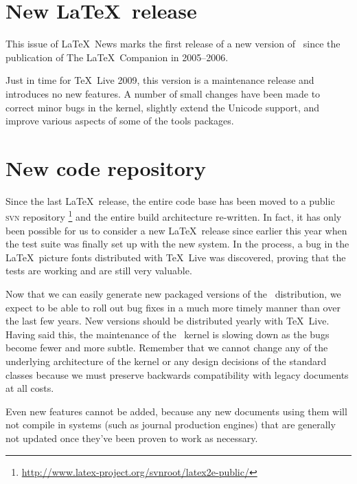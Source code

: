 \documentclass{ltnews}
\begin{document}
\maketitle

\section{New \LaTeX\ release}

This  issue of \LaTeX~News marks the first release of a new version of
\LaTeXe\ since the publication of The \LaTeX\ Companion in 2005--2006.

Just in time for \TeX\ Live 2009, this version is a maintenance
release and introduces no new features. A number of small changes have
been made to correct minor bugs in the kernel, slightly extend the Unicode
support, and improve various
aspects of some of the \textsf{tools} packages.

\section{New code repository}

Since the last \LaTeX\ release, the entire code base has been moved
to a public \textsc{svn} repository%
\footnote{\url{http://www.latex-project.org/svnroot/latex2e-public/}}
and the entire build architecture re-written. In fact, it has only
been possible for us to consider a new \LaTeX\ release since earlier
this year when the test suite was finally set up with the new system.
In the process, a bug in the \LaTeX\ picture fonts distributed with
\TeX\ Live was discovered, proving that the
tests are working and are still very valuable.

Now that we can easily generate new packaged versions of the \LaTeXe\
distribution, we expect to be able to roll out bug fixes in a much
more timely manner than over the last few years. New versions should
be distributed yearly with \TeX\ Live. Having said this, the
maintenance of the \LaTeXe\ kernel is slowing down as the bugs become
fewer and more subtle. Remember that we cannot change any of the
underlying architecture of the kernel or any design decisions of the
standard classes because we must preserve backwards compatibility with
legacy documents at all costs.

Even new features cannot be added, because any new documents using
them will not compile in systems (such as journal production engines)
that are generally not updated once they've been proven to work as
necessary.
\end{document}
